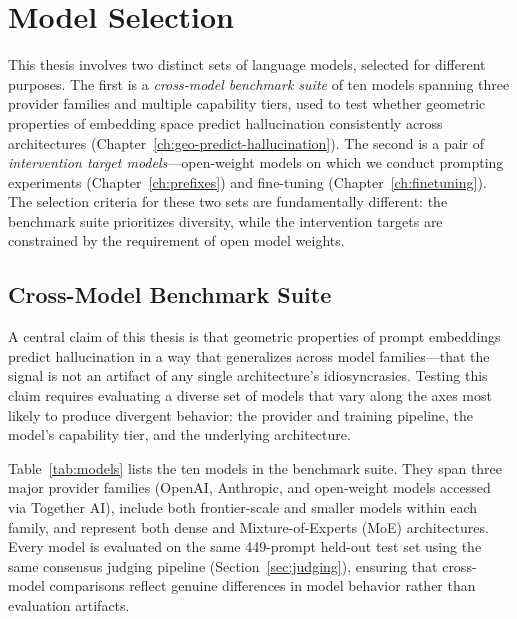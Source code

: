 \section{Model Selection}
\label{sec:models}

This thesis involves two distinct sets of language models, selected for different purposes. The first is a \emph{cross-model benchmark suite} of ten models spanning three provider families and multiple capability tiers, used to test whether geometric properties of embedding space predict hallucination consistently across architectures (Chapter~\ref{ch:geo-predict-hallucination}). The second is a pair of \emph{intervention target models}---open-weight models on which we conduct prompting experiments (Chapter~\ref{ch:prefixes}) and fine-tuning (Chapter~\ref{ch:finetuning}). The selection criteria for these two sets are fundamentally different: the benchmark suite prioritizes diversity, while the intervention targets are constrained by the requirement of open model weights.

\subsection{Cross-Model Benchmark Suite}
\label{sec:benchmark-models}

A central claim of this thesis is that geometric properties of prompt embeddings predict hallucination in a way that generalizes across model families---that the signal is not an artifact of any single architecture's idiosyncrasies. Testing this claim requires evaluating a diverse set of models that vary along the axes most likely to produce divergent behavior: the provider and training pipeline, the model's capability tier, and the underlying architecture.

Table~\ref{tab:models} lists the ten models in the benchmark suite. They span three major provider families (OpenAI, Anthropic, and open-weight models accessed via Together AI), include both frontier-scale and smaller models within each family, and represent both dense and Mixture-of-Experts (MoE) architectures. Every model is evaluated on the same 449-prompt held-out test set using the same consensus judging pipeline (Section~\ref{sec:judging}), ensuring that cross-model comparisons reflect genuine differences in model behavior rather than evaluation artifacts.

